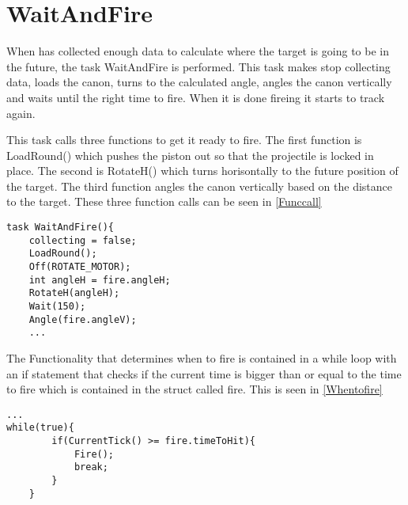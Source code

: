 \section{WaitAndFire}
When \name has collected enough data to calculate where the target is going to
be in the future, the task WaitAndFire is performed. This task makes \name stop
collecting data, loads the canon, turns to the calculated angle, angles the
canon vertically and waits until the right time to fire. When it is done fireing
it starts to track again.\nl

This task calls three functions to get it ready to fire. The first function is
LoadRound() which pushes the piston out so that the projectile is locked in
place. The second is RotateH() which turns \name horisontally to the future
position of the target. The third function angles the canon vertically based on
the distance to the target. These three function calls can be seen in
\autoref{Funccall}\nl

\begin{minipage}[H]{\linewidth}
\begin{lstlisting}[caption = Function calls in WaitAndFire, label = Funccall,
style = nc] 
task WaitAndFire(){
    collecting = false;
    LoadRound();
    Off(ROTATE_MOTOR);
    int angleH = fire.angleH;
    RotateH(angleH);
    Wait(150);
    Angle(fire.angleV);
    ...
\end{lstlisting}
\end{minipage}

The Functionality that determines when to fire is contained in a while loop with
an if statement that checks if the current time is bigger than or equal to the
time to fire which is contained in the struct called fire. This is seen in
\autoref{Whentofire}\nl
 
\begin{minipage}[H]{\linewidth}
\begin{lstlisting}[caption = While that determines when to fire, label =
Whentofire, style = nc] ...
while(true){
        if(CurrentTick() >= fire.timeToHit){
            Fire();
            break;
        }
    }
\end{lstlisting}
\end{minipage}




